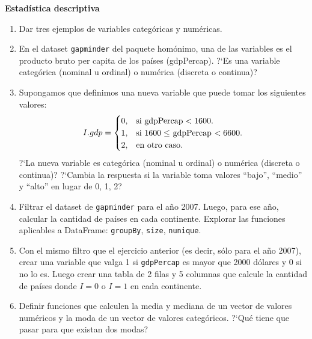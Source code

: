 \documentclass[a4paper,11pt]{article}
\theoremstyle{definition}
\begin{document}
\textbf{\large Estad\'istica descriptiva}
\begin{enumerate}[resume]

\item Dar tres ejemplos de variables categ\'oricas y num\'ericas.

\item En el dataset \lstinline{gapminder} del paquete hom\'onimo, una de las variables es el producto bruto per capita de los pa\'ises (gdpPercap). ?`Es una variable categ\'orica (nominal u ordinal) o num\'erica (discreta o continua)?

\item Supongamos que definimos una nueva variable que puede tomar los siguientes valores:
\[
I.gdp = \begin{cases}
0, & \text{si \lstinline{gdpPercap}} < 1600. \\
1, & \text{si $1600 \le $ \lstinline{gdpPercap} $< 6600$}. \\
2, & \text{en otro caso.} \\
\end{cases}
\]
?`La nueva variable
 es categ\'orica (nominal u ordinal) o num\'erica (discreta o continua)? ?`Cambia la respuesta si la variable
 toma valores ``bajo'', ``medio'' y ``alto'' en lugar de 0, 1, 2?

\item Filtrar el dataset de \lstinline{gapminder} para el a\~no 2007. Luego, para ese a\~no, calcular la cantidad de pa\'ises en cada continente. Explorar las funciones aplicables a DataFrame: \lstinline{groupBy}, \lstinline{size}, \lstinline{nunique}.

\item Con el mismo filtro que el ejercicio anterior (es decir, s\'olo para el a\~no 2007), crear una variable
 que valga 1 si \lstinline{gdpPercap} es mayor que 2000 d\'olares y 0 si no lo es. Luego crear una tabla de 2 filas y 5 columnas que calcule la cantidad de pa\'ises donde $I = 0$ o $I = 1$
 en cada continente.


\item Definir funciones que calculen la media y mediana de un vector de valores numéricos y la moda de un vector de valores categóricos. ?`Qu\'e tiene que pasar para que existan dos modas?


\end{enumerate}
\end{document}

